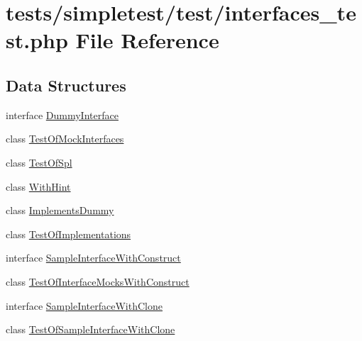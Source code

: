\hypertarget{interfaces__test_8php}{\section{tests/simpletest/test/interfaces\-\_\-test.php File Reference}
\label{interfaces__test_8php}
}
\subsection*{Data Structures}
\begin{DoxyCompactItemize}
\item 
interface \hyperlink{interface_dummy_interface}{Dummy\-Interface}
\item 
class \hyperlink{class_test_of_mock_interfaces}{Test\-Of\-Mock\-Interfaces}
\item 
class \hyperlink{class_test_of_spl}{Test\-Of\-Spl}
\item 
class \hyperlink{class_with_hint}{With\-Hint}
\item 
class \hyperlink{class_implements_dummy}{Implements\-Dummy}
\item 
class \hyperlink{class_test_of_implementations}{Test\-Of\-Implementations}
\item 
interface \hyperlink{interface_sample_interface_with_construct}{Sample\-Interface\-With\-Construct}
\item 
class \hyperlink{class_test_of_interface_mocks_with_construct}{Test\-Of\-Interface\-Mocks\-With\-Construct}
\item 
interface \hyperlink{interface_sample_interface_with_clone}{Sample\-Interface\-With\-Clone}
\item 
class \hyperlink{class_test_of_sample_interface_with_clone}{Test\-Of\-Sample\-Interface\-With\-Clone}
\end{DoxyCompactItemize}
